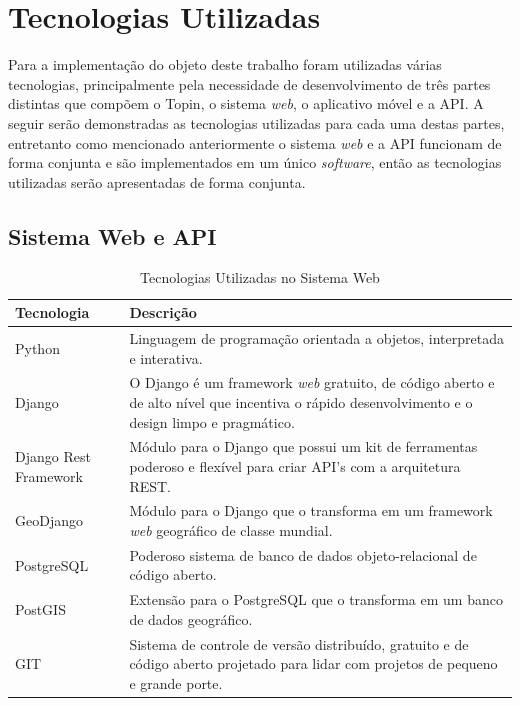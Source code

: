 {{{{{\section{Tecnologias Utilizadas}

Para a implementação do objeto deste trabalho foram utilizadas várias tecnologias, principalmente pela necessidade de desenvolvimento de três partes distintas que compõem o Topin, o sistema \textit{web}, o aplicativo móvel e a API. A seguir serão demonstradas as tecnologias utilizadas para cada uma destas partes, entretanto como mencionado anteriormente o sistema \textit{web} e a API funcionam de forma conjunta e são implementados em um único \textit{software}, então as tecnologias utilizadas serão apresentadas de forma conjunta.

\subsection*{Sistema Web e API}

{\renewcommand{\arraystretch}{2}
\begin{table}[H]
\centering
\caption{Tecnologias Utilizadas no Sistema Web}
\label{tab:tecnologias-utilizadas-web}
\begin{tabular}{ l | p{11cm} }
\hline
\textbf{Tecnologia} & \textbf{Descrição} \\
\hline
Python\footnotemark & Linguagem de programação orientada a objetos, interpretada e interativa. \\ \hline
Django\footnotemark & O Django é um framework \textit{web} gratuito, de código aberto e de alto nível que incentiva o rápido desenvolvimento e o design limpo e pragmático. \\ \hline
Django Rest Framework\footnotemark & Módulo para o Django que possui um kit de ferramentas poderoso e flexível para criar API's com a arquitetura REST. \\ \hline
GeoDjango\footnotemark & Módulo para o Django que o transforma em um framework \textit{web} geográfico de classe mundial. \\ \hline
PostgreSQL\footnotemark & Poderoso sistema de banco de dados objeto-relacional de código aberto. \\ \hline
PostGIS\footnotemark & Extensão para o PostgreSQL que o transforma em um banco de dados geográfico. \\ \hline
GIT\footnotemark & Sistema de controle de versão distribuído, gratuito e de código aberto projetado para lidar com projetos de pequeno e grande porte. \\ \hline
\end{tabular}
\end{table}

}}}}}}
